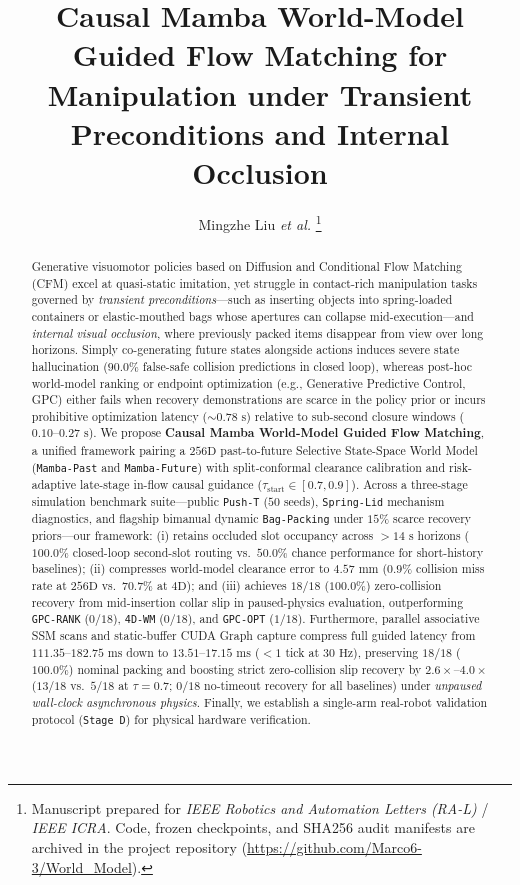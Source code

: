 \documentclass[letterpaper, 10pt, conference]{ieeeconf}
\title{\LARGE \bf
Causal Mamba World-Model Guided Flow Matching for Manipulation under Transient Preconditions and Internal Occlusion
}
\author{Mingzhe Liu \textit{et al.}%
\thanks{Manuscript prepared for \textit{IEEE Robotics and Automation Letters (RA-L)} / \textit{IEEE ICRA}. Code, frozen checkpoints, and SHA256 audit manifests are archived in the project repository (\url{https://github.com/Marco6-3/World_Model}).}%
}
\begin{document}
\maketitle
\thispagestyle{empty}
\pagestyle{empty}

\begin{abstract}
Generative visuomotor policies based on Diffusion and Conditional Flow Matching (CFM) excel at quasi-static imitation, yet struggle in contact-rich manipulation tasks governed by \emph{transient preconditions}---such as inserting objects into spring-loaded containers or elastic-mouthed bags whose apertures can collapse mid-execution---and \emph{internal visual occlusion}, where previously packed items disappear from view over long horizons. Simply co-generating future states alongside actions induces severe state hallucination ($90.0\%$ false-safe collision predictions in closed loop), whereas post-hoc world-model ranking or endpoint optimization (e.g., Generative Predictive Control, GPC) either fails when recovery demonstrations are scarce in the policy prior or incurs prohibitive optimization latency ($\sim 0.78\text{ s}$) relative to sub-second closure windows ($0.10\text{--}0.27\text{ s}$). We propose \textbf{Causal Mamba World-Model Guided Flow Matching}, a unified framework pairing a $256\text{D}$ past-to-future Selective State-Space World Model (\texttt{Mamba-Past} and \texttt{Mamba-Future}) with split-conformal clearance calibration and risk-adaptive late-stage in-flow causal guidance ($\tau_{\text{start}} \in [0.7, 0.9]$). Across a three-stage simulation benchmark suite---public \texttt{Push-T} ($50$ seeds), \texttt{Spring-Lid} mechanism diagnostics, and flagship bimanual dynamic \texttt{Bag-Packing} under $15\%$ scarce recovery priors---our framework: (i) retains occluded slot occupancy across $>14\text{ s}$ horizons ($100.0\%$ closed-loop second-slot routing vs.\ $50.0\%$ chance performance for short-history baselines); (ii) compresses world-model clearance error to $4.57\text{ mm}$ ($0.9\%$ collision miss rate at $256\text{D}$ vs.\ $70.7\%$ at $4\text{D}$); and (iii) achieves $18/18$ ($100.0\%$) zero-collision recovery from mid-insertion collar slip in paused-physics evaluation, outperforming \texttt{GPC-RANK} ($0/18$), \texttt{4D-WM} ($0/18$), and \texttt{GPC-OPT} ($1/18$). Furthermore, parallel associative SSM scans and static-buffer CUDA Graph capture compress full guided latency from $111.35\text{--}182.75\text{ ms}$ down to $13.51\text{--}17.15\text{ ms}$ ($<1$ tick at $30\text{ Hz}$), preserving $18/18$ ($100.0\%$) nominal packing and boosting strict zero-collision slip recovery by $2.6\times\text{--}4.0\times$ ($13/18$ vs.\ $5/18$ at $\tau=0.7$; $0/18$ no-timeout recovery for all baselines) under \emph{unpaused wall-clock asynchronous physics}. Finally, we establish a single-arm real-robot validation protocol (\texttt{Stage D}) for physical hardware verification.
\end{abstract}
\end{document}
